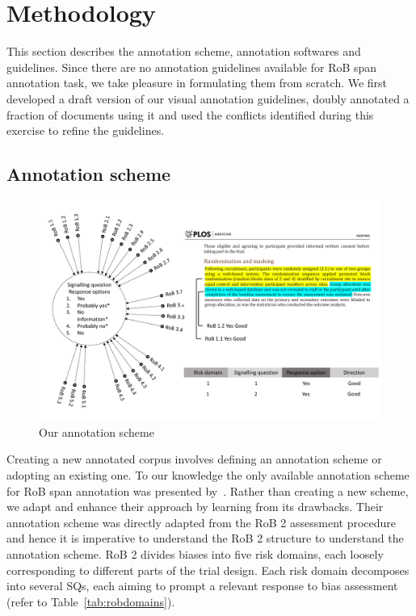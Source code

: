 \documentclass[sn-mathphys,Numbered]{sn-jnl}%
\theoremstyle{thmstyleone}%
\theoremstyle{thmstyletwo}%
\theoremstyle{thmstylethree}%
\begin{document}
\section{Methodology}
\label{sec:methods}
%
This section describes the annotation scheme, annotation softwares and guidelines.
Since there are no annotation guidelines available for RoB span annotation task, we take pleasure in formulating them from scratch. 
We first developed a draft version of our visual annotation guidelines, doubly annotated a fraction of documents using it and used the conflicts identified during this exercise to refine the guidelines.
%
%
%
\subsection{Annotation scheme}
\label{met:annot_scheme}
%

%
%
%
\begin{figure}
    \centering
    \includegraphics[width=0.99\columnwidth]{figures/annotation_schema.pdf}
    \caption{Our annotation scheme}
    \label{fig:annotationscheme}
\end{figure}
%
%
%



Creating a new annotated corpus involves defining an annotation scheme or adopting an existing one.
To our knowledge the only available annotation scheme for RoB span annotation was presented by~\cite{dhrangadhariya2023first}.
Rather than creating a new scheme, we adapt and enhance their approach by learning from its drawbacks.
Their annotation scheme was directly adapted from the RoB 2 assessment procedure and hence it is imperative to understand the RoB 2 structure to understand the annotation scheme.
RoB 2 divides biases into five risk domains, each loosely corresponding to different parts of the trial design.
Each risk domain decomposes into several SQs, each aiming to prompt a relevant response to bias assessment (refer to Table~\ref{tab:robdomains}).
\end{document}
